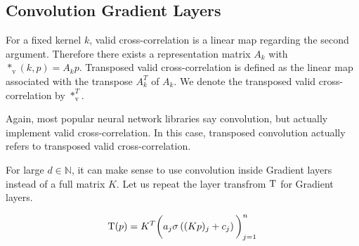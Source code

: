 \documentclass[twoside,a4paper]{article}
\begin{document}
\subsection{Convolution Gradient Layers}\label{sec_conv_gradient_layer}

For a fixed kernel $k$, valid cross-correlation is a linear map regarding the second argument. 
Therefore there exists a representation matrix $A_{k}$ with 
$*_{\text{v}}(k,p) = A_{k}p$. Transposed valid cross-correlation 
is defined as the linear map associated with the transpose $A_{k}^T$ of $A_{k}$.
We denote the transposed valid cross-correlation by $*_{\text{v}}^T$.

Again, most popular neural network libraries say convolution, but actually implement
valid cross-correlation. In this case, transposed convolution actually refers to
transposed valid cross-correlation.

For large $d \in \mathbb{N}$, it can make sense to use convolution inside Gradient layers 
instead of a full matrix $K$. Let us repeat the layer transfrom $\mathrm{T}$ for Gradient layers.

\begin{equation*}
	\mathrm{T}(p) = K^T \bigg( a_j \sigma \left( (Kp)_j + c_j \right) \bigg)_{j=1}^n
\end{equation*}
\end{document}
